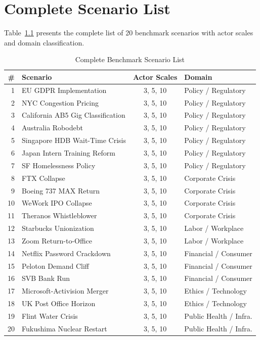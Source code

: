 \chapter{Complete Scenario List}
\label{app:scenarios}

Table~\ref{tab:full_scenarios} presents the complete list of 20 benchmark scenarios with actor scales and domain classification.

\begin{table}[ht]
\centering
\caption{Complete Benchmark Scenario List}
\label{tab:full_scenarios}
\small
\begin{tabular}{rlcl}
\toprule
\# & Scenario & Actor Scales & Domain \\
\midrule
1  & EU GDPR Implementation & 3, 5, 10 & Policy / Regulatory \\
2  & NYC Congestion Pricing & 3, 5, 10 & Policy / Regulatory \\
3  & California AB5 Gig Classification & 3, 5, 10 & Policy / Regulatory \\
4  & Australia Robodebt & 3, 5, 10 & Policy / Regulatory \\
5  & Singapore HDB Wait-Time Crisis & 3, 5, 10 & Policy / Regulatory \\
6  & Japan Intern Training Reform & 3, 5, 10 & Policy / Regulatory \\
7  & SF Homelessness Policy & 3, 5, 10 & Policy / Regulatory \\
8  & FTX Collapse & 3, 5, 10 & Corporate Crisis \\
9  & Boeing 737 MAX Return & 3, 5, 10 & Corporate Crisis \\
10 & WeWork IPO Collapse & 3, 5, 10 & Corporate Crisis \\
11 & Theranos Whistleblower & 3, 5, 10 & Corporate Crisis \\
12 & Starbucks Unionization & 3, 5, 10 & Labor / Workplace \\
13 & Zoom Return-to-Office & 3, 5, 10 & Labor / Workplace \\
14 & Netflix Password Crackdown & 3, 5, 10 & Financial / Consumer \\
15 & Peloton Demand Cliff & 3, 5, 10 & Financial / Consumer \\
16 & SVB Bank Run & 3, 5, 10 & Financial / Consumer \\
17 & Microsoft-Activision Merger & 3, 5, 10 & Ethics / Technology \\
18 & UK Post Office Horizon & 3, 5, 10 & Ethics / Technology \\
19 & Flint Water Crisis & 3, 5, 10 & Public Health / Infra. \\
20 & Fukushima Nuclear Restart & 3, 5, 10 & Public Health / Infra. \\
\bottomrule
\end{tabular}
\end{table}
